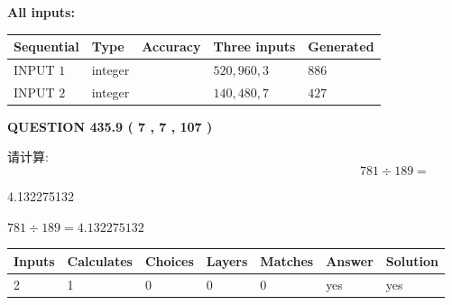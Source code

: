 \documentclass{ctexart}
\begin{document}
   
   
   
\noindent\vspace{0.1in}\hspace{-0.08in} {\textbf{\Large{All inputs: }}}
   
   
  
  
\noindent\begin{tabular}{|l|l|l|l|l|}
\hline
 Sequential & Type & Accuracy & Three inputs & Generated \\ 
\hline
 
 
  INPUT $  1 $ & integer &  & $
 520
 , 
 960
 , 
 3
 $ & $ 886 $ 
 \\  \hline  
 
 
  INPUT $  2 $ & integer &  & $
 140
 , 
 480
 , 
 7
 $ & $ 427 $ 
 \\  \hline  
 \end{tabular}
   
   
  
\vspace{0.2in}
  
{\textbf{\Large{QUESTION
435.9 
 ( 7 , 7 , 107 )
}}}
  
  
 
请计算:
\begin{equation}
781  \div    %
189 = \nonumber
\end{equation}
 
 
 
\noindent{}
 
 

4.132275132
 
 
\noindent{}
 
 

 
 
 
\noindent{}
 
 

$ %
781 \div  %
189=   %
4.132275132$
 
 
\noindent{}
 
 

 
   
   
   
   
\noindent\begin{tabular}{|l|l|l|l|l|l|l|}
 \hline
Inputs & Calculates & Choices & Layers & Matches & Answer & Solution \\ \hline
 2  & 
 1  & 
 0
  & 
 0  & 
 0  & 
  yes & 
  yes 
  \\ \hline
 \end{tabular}
   
\end{document}
